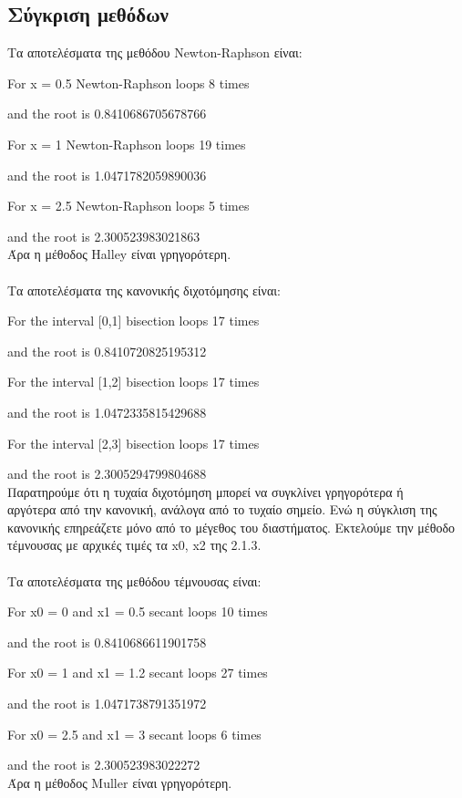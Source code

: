 \documentclass[a4paper,11pt]{article}
\newcommand{\lt}{\latintext}
\newcommand{\gt}{\greektext}
\begin{document}
	\subsection{Σύγκριση μεθόδων}
	\normalsize{
Τα αποτελέσματα της μεθόδου \lt Newton-Raphson \gt είναι: \lt
\par For x = 0.5 Newton-Raphson loops 8 times 
\par and the root is 0.8410686705678766
\par For x = 1 Newton-Raphson loops 19 times 
\par and the root is 1.0471782059890036
\par For x = 2.5 Newton-Raphson loops 5 times 
\par and the root is 2.300523983021863 \\
\gt Άρα η μέθοδος \lt Halley \gt είναι γρηγορότερη.
\\ 
\\ Τα αποτελέσματα της κανονικής διχοτόμησης είναι: \lt
\par For the interval [0,1] bisection loops 17 times 
\par and the root is 0.8410720825195312
\par For the interval [1,2] bisection loops 17 times 
\par and the root is 1.0472335815429688
\par For the interval [2,3] bisection loops 17 times 
\par and the root is 2.3005294799804688
\gt \\ Παρατηρούμε ότι η τυχαία διχοτόμηση μπορεί να συγκλίνει
γρηγορότερα ή \\ αργότερα από την κανονική, ανάλογα από το τυχαίο
σημείο. Ενώ η σύγκλιση της κανονικής επηρεάζετε μόνο από το μέγεθος
του διαστήματος. Εκτελούμε την μέθοδο τέμνουσας με αρχικές τιμές τα
\lt x0, x2 \gt της 2.1.3.
\\
\\ Τα αποτελέσματα της μεθόδου τέμνουσας είναι: \lt 
\par For x0 = 0 and x1 = 0.5 secant loops 10 times 
\par and the root is 0.8410686611901758
\par For x0 = 1 and x1 = 1.2 secant loops 27 times 
\par and the root is 1.0471738791351972
\par For x0 = 2.5 and x1 = 3 secant loops 6 times 
\par and the root is 2.300523983022272
\gt \\Άρα η μέθοδος \lt Muller \gt είναι γρηγορότερη.}
\end{document}
